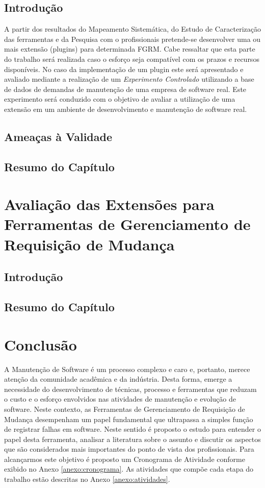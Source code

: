\documentclass[msc]{ppgccufmg} %
\begin{document}
\section{Introdução}
A partir dos resultados do Mapeamento Sistemática, do Estudo de Caracterização das ferramentas e da Pesquisa com o profissionais pretende-se desenvolver uma ou mais extensão (plugins) para determinada FGRM. Cabe ressaltar que esta parte do trabalho será realizada caso o esforço seja compatível com os prazos e recursos disponíveis. No caso da implementação de um plugin este será apresentado e avaliado mediante a realização de um \textit{Experimento Controlado} \cite{wohlin2012experimentation} utilizando a base de dados de demandas de manutenção de uma empresa de software real. Este experimento será conduzido com o objetivo de avaliar a utilização de uma extensão em um ambiente de desenvolvimento e manutenção de software real.

\section{Ameaças à Validade}

\section{Resumo do Capítulo}

\chapter{Avaliação das Extensões para Ferramentas de Gerenciamento de Requisição de Mudança}

\section{Introdução}

\section{Resumo do Capítulo}

\chapter{Conclusão}
\label{ch:conclusao_trab_futuros}

A Manutenção de Software é um processo complexo e caro e, portanto,  merece atenção da
comunidade acadêmica e da indústria. Desta forma, emerge a necessidade do desenvolvimento de técnicas, processo e ferramentas que reduzam o custo e o esforço envolvidos nas atividades de manutenção e evolução de software. Neste contexto, as Ferramentas de Gerenciamento de Requisição de Mudança desempenham um papel fundamental que ultrapassa a simples função de registrar falhas em software. Neste sentido é proposto o estudo para entender o papel desta ferramenta, analisar a literatura sobre o assunto e discutir os aspectos que são considerados mais importantes do ponto de vista dos profissionais. Para alcançarmos este objetivo é proposto um Cronograma de Atividade conforme exibido no Anexo \ref{anexo:cronograma}. As atividades que compõe cada etapa do trabalho estão descritas no Anexo \ref{anexo:atividades}.
\end{document}
